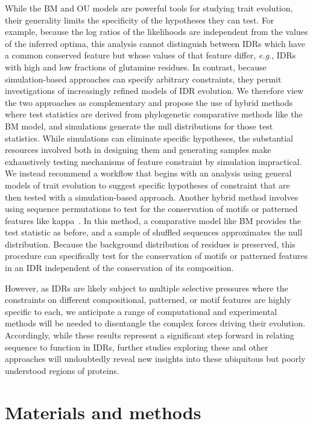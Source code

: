 While the BM and OU models are powerful tools for studying trait evolution, their generality limits the specificity of the hypotheses they can test. For example, because the log ratios of the likelihoods are independent from the values of the inferred optima, this analysis cannot distinguish between IDRs which have a common conserved feature but whose values of that feature differ, \textit{e.g.}, IDRs with high and low fractions of glutamine residues. In contrast, because simulation-based approaches can specify arbitrary constraints, they permit investigations of increasingly refined models of IDR evolution. We therefore view the two approaches as complementary and propose the use of hybrid methods where test statistics are derived from phylogenetic comparative methods like the BM model, and simulations generate the null distributions for those test statistics. While simulations can eliminate specific hypotheses, the substantial resources involved both in designing them and generating samples make exhaustively testing mechanisms of feature constraint by simulation impractical. We instead recommend a workflow that begins with an analysis using general models of trait evolution to suggest specific hypotheses of constraint that are then tested with a simulation-based approach. Another hybrid method involves using sequence permutations to test for the conservation of motifs or patterned features like kappa~\cite{Cohan2022}. In this method, a comparative model like BM provides the test statistic as before, and a sample of shuffled sequences approximates the null distribution. Because the background distribution of residues is preserved, this procedure can specifically test for the conservation of motifs or patterned features in an IDR independent of the conservation of its composition.

However, as IDRs are likely subject to multiple selective pressures where the constraints on different compositional, patterned, or motif features are highly specific to each, we anticipate a range of computational and experimental methods will be needed to disentangle the complex forces driving their evolution. Accordingly, while these results represent a significant step forward in relating sequence to function in IDRs, further studies exploring these and other approaches will undoubtedly reveal new insights into these ubiquitous but poorly understood regions of proteins.

\section{Materials and methods}
